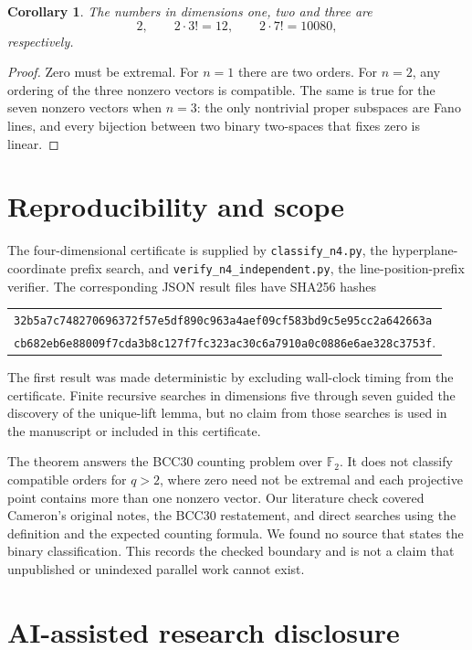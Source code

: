 \documentclass[11pt]{article}
\newtheorem{corollary}[theorem]{Corollary}
\begin{document}
\begin{corollary}
The numbers in dimensions one, two and three are
\[
2,\qquad 2\cdot3!=12,\qquad 2\cdot7!=10080,
\]
respectively.
\end{corollary}

\begin{proof}
Zero must be extremal. For $n=1$ there are two orders. For $n=2$, any
ordering of the three nonzero vectors is compatible. The same is true for the
seven nonzero vectors when $n=3$: the only nontrivial proper subspaces are
Fano lines, and every bijection between two binary two-spaces that fixes zero
is linear.
\end{proof}

\section{Reproducibility and scope}

The four-dimensional certificate is supplied by \texttt{classify\_n4.py},
the hyperplane-coordinate prefix search, and
\texttt{verify\_n4\_independent.py}, the line-position-prefix verifier. The
corresponding JSON result files have SHA256 hashes
\begin{center}
\begin{tabular}{l}
\texttt{32b5a7c748270696372f57e5df890c963a4aef09cf583bd9c5e95cc2a642663a}\\
\texttt{cb682eb6e88009f7cda3b8c127f7fc323ac30c6a7910a0c0886e6ae328c3753f}.
\end{tabular}
\end{center}
The first result was made deterministic by excluding wall-clock timing from
the certificate. Finite recursive searches in dimensions five through seven
guided the discovery of the unique-lift lemma, but no claim from those
searches is used in the manuscript or included in this certificate.

The theorem answers the BCC30 counting problem over $\mathbb F_2$. It does
not classify compatible orders for $q>2$, where zero need not be extremal and
each projective point contains more than one nonzero vector. Our literature
check covered Cameron's original notes, the BCC30 restatement, and direct
searches using the definition and the expected counting formula. We found no
source that states the binary classification. This records the checked
boundary and is not a claim that unpublished or unindexed parallel work
cannot exist.

\section*{AI-assisted research disclosure}
\end{document}
